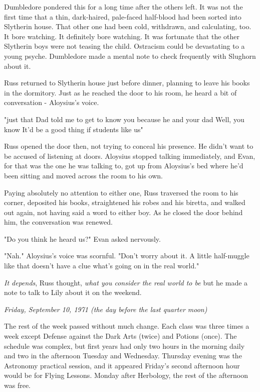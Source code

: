 Dumbledore pondered this for a long time after the others left. It was not the first time that a thin, dark-haired, pale-faced half-blood had been sorted into Slytherin house. That other one had been cold, withdrawn, and calculating, too. It bore watching. It definitely bore watching. It was fortunate that the other Slytherin boys were not teasing the child. Ostracism could be devastating to a young psyche. Dumbledore made a mental note to check frequently with Slughorn about it.

Russ returned to Slytherin house just before dinner, planning to leave his books in the dormitory. Just as he reached the door to his room, he heard a bit of conversation - Aloysius's voice.

"{\el}just that Dad told me to get to know you because he and your dad{\el} Well, you know{\el} It'd be a good thing if students like us{\el}"

Russ opened the door then, not trying to conceal his presence. He didn't want to be accused of listening at doors. Aloysius stopped talking immediately, and Evan, for that was the one he was talking to, got up from Aloysius's bed where he'd been sitting and moved across the room to his own.

Paying absolutely no attention to either one, Russ traversed the room to his corner, deposited his books, straightened his robes and his biretta, and walked out again, not having said a word to either boy. As he closed the door behind him, the conversation was renewed.

"Do you think he heard us?" Evan asked nervously.

"Nah." Aloysius's voice was scornful. "Don't worry about it. A little half-muggle like that doesn't have a clue what's going on in the real world."

\emph{It depends}, Russ thought, \emph{what you consider the real world to be}{\el} but he made a note to talk to Lily about it on the weekend.

\emph{Friday, September 10, 1971 (the day before the last quarter moon)}

The rest of the week passed without much change. Each class was three times a week except Defense against the Dark Arts (twice) and Potions (once). The schedule was complex, but first years had only two hours in the morning daily and two in the afternoon Tuesday and Wednesday. Thursday evening was the Astronomy practical session, and it appeared Friday's second afternoon hour would be for Flying Lessons. Monday after Herbology, the rest of the afternoon was free.

